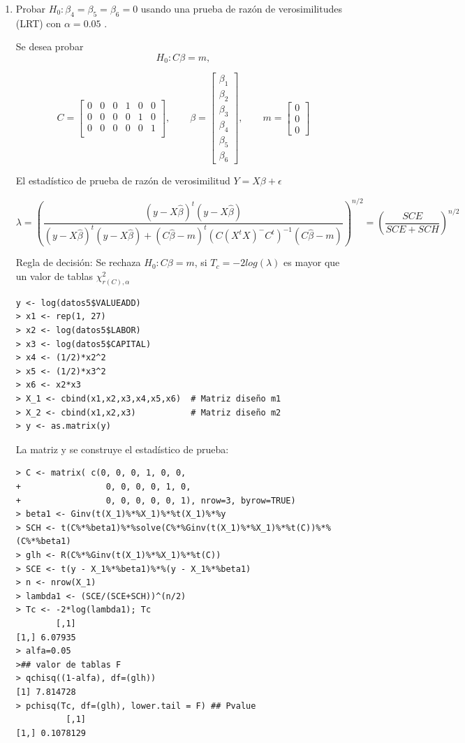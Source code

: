 \documentclass[12pt,a4paper]{report}
\begin{document}
\begin{enumerate}


\item[a)] Probar $H_0 : \beta_4 = \beta_5 = \beta_6 = 0$ usando una prueba de razón de verosimilitudes (LRT) con $\alpha = 0.05$ .


Se desea probar
\[H_0 : C\beta = m,\]

\[
C=\begin{bmatrix}
0 & 0 & 0 & 1 & 0 & 0 \\
0 & 0 & 0 & 0 & 1 & 0 \\
0 & 0 & 0 & 0 & 0 & 1 \\
\end{bmatrix}, \qquad
\beta = \begin{bmatrix}
\beta_1 \\ \beta_2 \\ \beta_3 \\ \beta_4 \\ \beta_5 \\ \beta_6
\end{bmatrix}, \qquad
m=\begin{bmatrix}
0 \\ 0 \\ 0
\end{bmatrix}
\]

El estadístico de prueba de razón de verosimilitud $Y = X\beta + \epsilon$

\[\lambda = \left( \frac{(y - X\widehat{\beta})^t(y - X\widehat{\beta})}{(y - X\widehat{\beta})^t(y - X\widehat{\beta}) + (C\widehat{\beta} - m)^t(C(X^tX)^{-}C^t)^{-1}(C\widehat{\beta} - m)} \right)^{n/2} = \left( \frac{SCE}{SCE + SCH}\right)^{n/2}\]

Regla de decisión: Se rechaza $H_0 : C\beta = m$, si $T_c=-2 log(\lambda)$ es mayor que un valor de tablas $\chi_{r(C), \alpha}^{2}$

\begin{verbatim}
y <- log(datos5$VALUEADD)
> x1 <- rep(1, 27)
> x2 <- log(datos5$LABOR)
> x3 <- log(datos5$CAPITAL)
> x4 <- (1/2)*x2^2
> x5 <- (1/2)*x3^2
> x6 <- x2*x3
> X_1 <- cbind(x1,x2,x3,x4,x5,x6)  # Matriz diseño m1
> X_2 <- cbind(x1,x2,x3)           # Matriz diseño m2
> y <- as.matrix(y)
\end{verbatim}

La matriz y se construye el estadístico de prueba:

\begin{verbatim}
> C <- matrix( c(0, 0, 0, 1, 0, 0,
+                 0, 0, 0, 0, 1, 0,
+                 0, 0, 0, 0, 0, 1), nrow=3, byrow=TRUE)
> beta1 <- Ginv(t(X_1)%*%X_1)%*%t(X_1)%*%y
> SCH <- t(C%*%beta1)%*%solve(C%*%Ginv(t(X_1)%*%X_1)%*%t(C))%*%(C%*%beta1)
> glh <- R(C%*%Ginv(t(X_1)%*%X_1)%*%t(C))
> SCE <- t(y - X_1%*%beta1)%*%(y - X_1%*%beta1)
> n <- nrow(X_1)
> lambda1 <- (SCE/(SCE+SCH))^(n/2)
> Tc <- -2*log(lambda1); Tc
        [,1]
[1,] 6.07935
> alfa=0.05
>## valor de tablas F
> qchisq((1-alfa), df=(glh)) 
[1] 7.814728
> pchisq(Tc, df=(glh), lower.tail = F) ## Pvalue
          [,1]
[1,] 0.1078129
\end{verbatim}


\end{enumerate}
\end{document}
